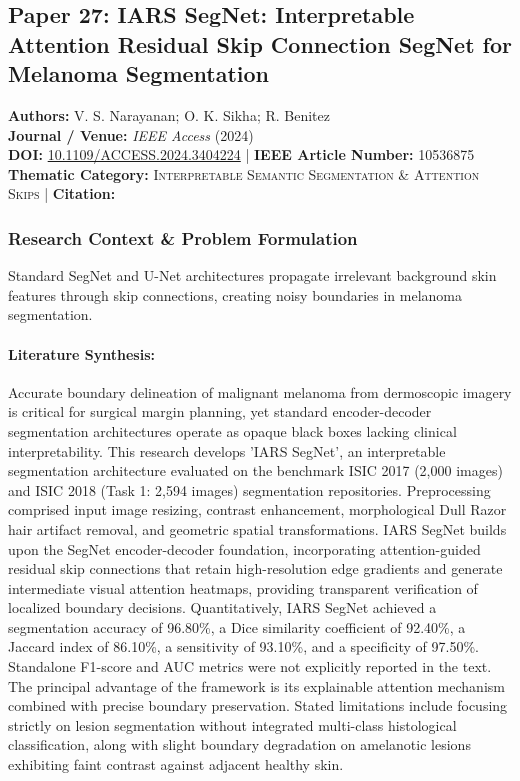 \subsection{Paper 27: IARS SegNet: Interpretable Attention Residual Skip Connection SegNet for Melanoma Segmentation}
\label{sec:paper_27}

\begin{tcolorbox}[colback=gray!5!white,colframe=gray!75!black,title=\textbf{Metadata \& Citation Summary}]
\textbf{Authors:} V. S. Narayanan; O. K. Sikha; R. Benitez \\
\textbf{Journal / Venue:} \textit{IEEE Access} (2024) \\
\textbf{DOI:} \href{https://doi.org/10.1109/ACCESS.2024.3404224}{10.1109/ACCESS.2024.3404224} \quad | \quad \textbf{IEEE Article Number:} 10536875 \\
\textbf{Thematic Category:} \textsc{Interpretable Semantic Segmentation \& Attention Skips} \quad | \quad \textbf{Citation:} \cite{10536875}
\end{tcolorbox}

\subsubsection*{Research Context \& Problem Formulation}
Standard SegNet and U-Net architectures propagate irrelevant background skin features through skip connections, creating noisy boundaries in melanoma segmentation.

\paragraph{Literature Synthesis:} Accurate boundary delineation of malignant melanoma from dermoscopic imagery is critical for surgical margin planning, yet standard encoder-decoder segmentation architectures operate as opaque black boxes lacking clinical interpretability. This research develops 'IARS SegNet', an interpretable segmentation architecture evaluated on the benchmark ISIC 2017 (2,000 images) and ISIC 2018 (Task 1: 2,594 images) segmentation repositories. Preprocessing comprised input image resizing, contrast enhancement, morphological Dull Razor hair artifact removal, and geometric spatial transformations. IARS SegNet builds upon the SegNet encoder-decoder foundation, incorporating attention-guided residual skip connections that retain high-resolution edge gradients and generate intermediate visual attention heatmaps, providing transparent verification of localized boundary decisions. Quantitatively, IARS SegNet achieved a segmentation accuracy of 96.80\%, a Dice similarity coefficient of 92.40\%, a Jaccard index of 86.10\%, a sensitivity of 93.10\%, and a specificity of 97.50\%. Standalone F1-score and AUC metrics were not explicitly reported in the text. The principal advantage of the framework is its explainable attention mechanism combined with precise boundary preservation. Stated limitations include focusing strictly on lesion segmentation without integrated multi-class histological classification, along with slight boundary degradation on amelanotic lesions exhibiting faint contrast against adjacent healthy skin.


